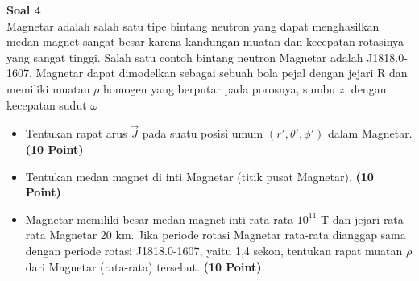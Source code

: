 \documentclass[a4paper, 11pt]{article}
\newenvironment{problem}[2][Soal]
    { \begin{mdframed}[backgroundcolor=violet!20] \textbf{#1 #2} \\}
    {  \end{mdframed}}
\begin{document}
\begin{problem}{4}
Magnetar adalah salah satu tipe bintang neutron yang dapat menghasilkan medan magnet sangat besar karena kandungan muatan dan kecepatan rotasinya yang sangat tinggi. Salah satu contoh bintang neutron Magnetar adalah J1818.0-1607. Magnetar dapat dimodelkan sebagai sebuah bola pejal dengan jejari R dan memiliki muatan $\rho$ homogen yang berputar pada porosnya, sumbu $z$, dengan kecepatan sudut $\omega$
\begin{itemize}
    \item[a.] Tentukan rapat arus $\vec{J}$ pada suatu posisi umum $(r', \theta ', \phi ')$ dalam Magnetar. \textbf{(10 Point)} 
    \item[b.] Tentukan medan magnet di inti Magnetar (titik pusat Magnetar). \textbf{(10 Point)}
    \item[c.] Magnetar memiliki besar medan magnet inti rata-rata $10^{11}$ T dan jejari rata-rata Magnetar 20 km. Jika periode rotasi Magnetar rata-rata dianggap sama dengan periode rotasi J1818.0-1607, yaitu 1,4 sekon, tentukan rapat muatan $\rho$ dari Magnetar (rata-rata) tersebut. \textbf{(10 Point)}
\end{itemize}

\end{problem}
\end{document}
